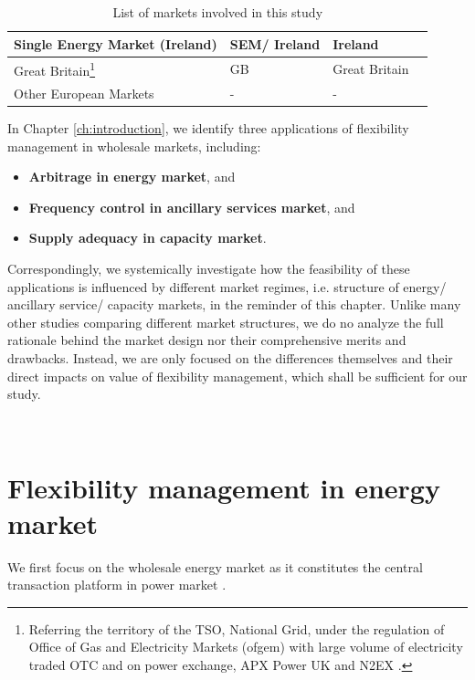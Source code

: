 \begin{table}[h!]
\begin{tabular}{L{5cm} l l l}
		\hline
		Single Energy Market (Ireland) & SEM/ Ireland & Ireland & \cite{FrontierEconomics2016,Cochran2013}\\
		\hline
		Great Britain\footnote{Referring the territory of the TSO, National Grid, under the regulation of Office of Gas and Electricity Markets (ofgem) with large volume of electricity traded OTC and on power exchange, APX Power UK and N2EX .} & GB & Great Britain & \cite{Rebours2009,FrontierEconomics2016,ofgem_cm,ofgem_m,EnergyUK2017} \\
		\hline
		Other European Markets & - & - & \cite{FrontierEconomics2016}\\
		\hline
		\hline
	\end{tabular}
	\caption{List of markets involved in this study} \label{tab:markets}
\end{table}

In Chapter \ref{ch:introduction}, we identify three applications of flexibility management in wholesale markets, including:

\begin{itemize}
	\item \textbf{Arbitrage in energy market}, and
	\item \textbf{Frequency control in ancillary services market}, and
	\item \textbf{Supply adequacy in capacity market}. 
\end{itemize}

Correspondingly, we systemically investigate how the feasibility of these applications is influenced by different market regimes, i.e. structure of energy/ ancillary service/ capacity markets, in the reminder of this chapter. Unlike many other studies comparing different market structures, we do no analyze the full rationale behind the market design nor their comprehensive merits and drawbacks. Instead, we are only focused on the differences themselves and their direct impacts on value of flexibility management, which shall be sufficient for our study.


~\newpage

\section{Flexibility management in energy market}
We first focus on the wholesale energy market as it constitutes the central transaction platform in power market \cite{Cochran2013}. 

